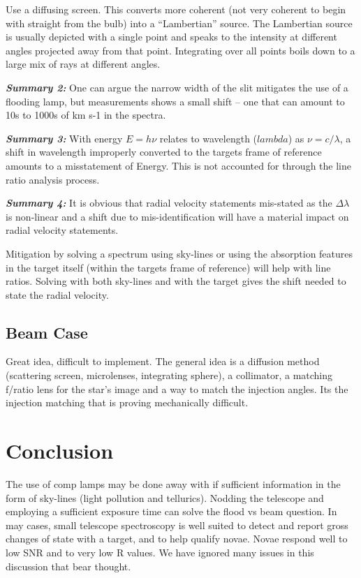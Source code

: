 \documentclass[letter,11pt,oneside]{article}
\begin{document}
Use a diffusing screen. This converts more coherent (not very coherent
to begin with straight from the bulb) into a ``Lambertian'' source.
The Lambertian source is usually depicted with a single point and 
speaks to the intensity at different angles projected away from that point.
Integrating over all points boils down to a large mix of rays at different
angles.

\textbf{\emph{Summary 2:}} One can argue the narrow width of the slit mitigates the
use of a flooding lamp, but measurements shows a small shift -- one
that can amount to 10s to 1000s of km s-1 in the spectra.

\textbf{\emph{Summary 3:}} With energy  $E=h\nu$ relates to wavelength ($lambda$)
as $\nu = c/\lambda$, a shift in wavelength improperly converted
to the targets frame of reference amounts to a misstatement of
Energy. This is not accounted for through the line ratio analysis
process.

\textbf{\emph{Summary 4:}} It is obvious that radial velocity statements mis-stated
as the $\Delta{\lambda}$ is non-linear and a shift due to mis-identification
will have a material impact on radial velocity statements.

Mitigation by solving a spectrum using sky-lines or using the absorption
features in the target itself (within the targets frame of reference)
will help with line ratios. Solving with both sky-lines and with
the target gives the shift needed to state the radial velocity.

\subsection{Beam Case}

Great idea, difficult to implement. The general idea is a diffusion
method (scattering screen, microlenses, integrating sphere), a 
collimator, a matching f/ratio lens for the star's image and
a way to match the injection angles. Its the injection matching
that is proving mechanically difficult.

\section{Conclusion}

The use of comp lamps may be done away with if sufficient information
in the form of sky-lines (light pollution and tellurics). Nodding
the telescope and employing a sufficient exposure time can solve
the flood vs beam question. In may cases, small telescope spectroscopy
is well suited to detect and report gross changes of state with 
a target, and to help qualify novae. Novae respond well to low
SNR and to very low R values. We have ignored many issues in this
discussion that bear thought.
\end{document}
